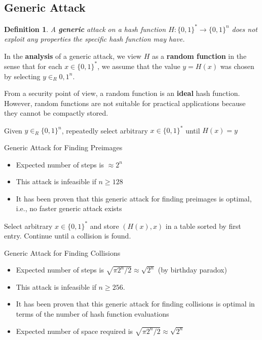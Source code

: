 \documentclass[12pt,titlepage]{article}
\newtheorem{protodefinition}[prototheorem]{Definition}
\newenvironment{definition}
{\colorlet{shadecolor}{cyan!15}\begin{shaded}\begin{protodefinition}\normalfont}{\end{protodefinition}\end{shaded}}
\begin{document}
\subsection{Generic Attack}
\begin{definition}
	A \textbf{generic} attack on a hash function $H: \{0, 1\}^* \rightarrow \{0, 1\}^n$ does not exploit any properties the specific hash function may have.
\end{definition}

In the \textbf{analysis} of a generic attack, we view $H$ as a \textbf{random function} in the sense that for each $x \in \{0,1\}^*$, we assume that the value $y = H(x)$ was chosen by selecting $y \in_R {0, 1}^n$.

From a security point of view, a random function is an \textbf{ideal} hash function. However, random functions are not suitable for practical applications because they cannot be compactly stored.

\begin{algorithm}[H]
	Given $y \in_R \{0, 1\}^n$, repeatedly select arbitrary $x \in \{0, 1\}^*$ until $H(x) = y$
	\caption{Generic Attack for Finding Preimages}
\end{algorithm}
\begin{itemize}
	\item Expected number of steps is $\approx 2^n$
	\item This attack is infeasible if $n \geq 128$
	\item It has been proven that this generic attack for finding preimages is optimal, i.e., no faster generic attack exists
\end{itemize}
\begin{algorithm}[H]
	Select arbitrary $x \in \{0, 1\}^*$ and store $(H(x), x)$ in a table sorted by first entry. Continue until a collision is found.
	\caption{Generic Attack for Finding Collisions}
\end{algorithm}
\begin{itemize}
	\item Expected number of steps is $\sqrt{\pi2^n / 2} \approx \sqrt{2^n}$ (by birthday paradox)
	\item This attack is infeasible if $n \geq 256$.
	\item It has been proven that this generic attack for finding collisions is optimal in terms of the number of hash function evaluations
	\item Expected number of space required is $\sqrt{\pi2^n / 2} \approx \sqrt{2^n}$
\end{itemize}
\end{document}
